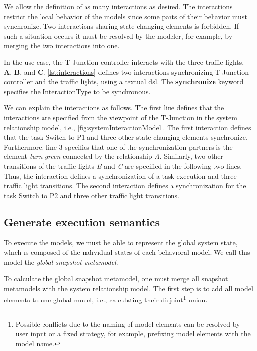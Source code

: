 \documentclass{jot}
\begin{document}
We allow the definition of as many interactions as desired.
The interactions restrict the local behavior of the models since some parts of their behavior must synchronize.
Two interactions sharing state changing elements is forbidden.
If such a situation occurs it must be resolved by the modeler, for example, by merging the two interactions into one.

In the use case, the T-Junction controller interacts with the three traffic lights, \textbf{A}, \textbf{B}, and \textbf{C}.
\autoref{lst:interactions} defines two interactions synchronizing T-Junction controller and the traffic lights, using a textual \gls*{dsl}.
The \textbf{synchronize} keyword specifies the \textsf{InteractionType} to be \textsf{synchronous}.



We can explain the interactions as follows.
The first line defines that the interactions are specified from the viewpoint of the T-Junction in the system relationship model, i.e., \autoref{fig:systemInteractionModel}.
The first interaction defines that the task \textsf{Switch to P1} and three other state changing elements synchronize.
Furthermore, line 3 specifies that one of the synchronization partners is the element \textit{turn green} connected by the relationship \textit{A}.
Similarly, two other transitions of the traffic lights \textit{B} and \textit{
C} are specified in the following two lines.
Thus, the interaction defines a synchronization of a task execution and three traffic light transitions. 
The second interaction defines a synchronization for the task \textsf{Switch to P2} and three other traffic light transitions.

\subsection{Generate execution semantics} \label{subsec:executionSemantics}
To execute the models, we must be able to represent the global system state, which is composed of the individual states of each behavioral model.
We call this model the \emph{global snapshot metamodel}.

To calculate the global snapshot metamodel, one must merge all snapshot metamodels with the system relationship model.
The first step is to add all model elements to one global model, i.e., calculating their disjoint\footnote{Possible conflicts due to the naming of model elements can be resolved by user input or a fixed strategy, for example, prefixing model elements with the model name.} union.
\end{document}
